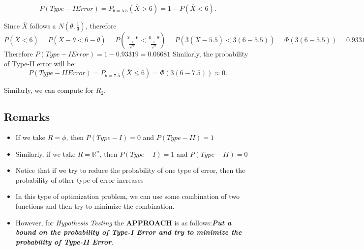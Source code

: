 \documentclass[a4paper]{article}
\begin{document}
\[
	P\left( Type-I Error \right) = P_{\theta = 5.5} (\overline{X} > 6) = 1 - P(\overline{X} < 6) 
.\] 

Since $ \overline{X} $ follows a $N(\theta,\frac{1}{9})$, therefore $P(\overline{X}<6) = P(\overline{X} - \theta < 6 - \theta) = P(\frac{\overline{X}-6}{\frac{1}{\sqrt{9} }} < \frac{6-\theta}{\frac{1}{\sqrt{9}} }) = P(3 \left( \overline{X} - 5.5 \right) < 3 \left( 6 - 5.5 \right) ) = \Phi(3\left( 6- 5.5 \right) ) = 0.93319$
\newline\newline
Therefore $P(Type-I Error) = 1 - 0.93319 = 0.06681$
\newline\newline
Similarly, the probability of Type-II error will be:
\[
	P(Type-II Error) = P_{\theta = 7.5} (\overline{X} \le  6) = \Phi(3\left( 6 - 7.5 \right) ) \approx  0
.\]

Similarly, we can compute for $R_2$.

\subsection{Remarks}

\begin{itemize}
	\item {If we take $R = \phi$, then  $P(Type-I) = 0$ and  $P(Type-II) = 1$}
	\item{Similarly, if we take $R = \mathbb{R}^{n}$, then $P(Type-I) = 1$ and $P(Type-II) = 0$}
	\item{Notice that if we try to reduce the probability of one type of error, then the probability of other type of error increases}
	\item{In this type of optimization problem, we can use some combination of two functions and then try to minimize the combination.}
	\item{However, for \textit{Hypothesis Testing} the \textbf{APPROACH} is as follows:\newline\newline \textit{\textbf{Put a bound on the probability of Type-I Error and try to minimize the probability of Type-II Error}}.}
\end{itemize}

	
\end{document}
